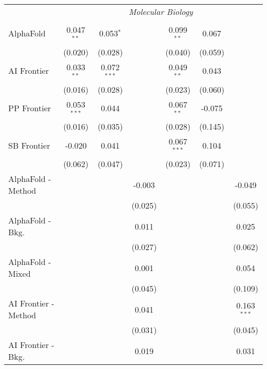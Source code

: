 \begin{tabular}{lcccccc}
 & \multicolumn{6}{c}{\textit{Molecular Biology}} \\ \\
   AlphaFold            & 0.047$^{**}$  & 0.053$^{*}$   &                & 0.099$^{**}$  & 0.067   &   \\   
                        & (0.020)       & (0.028)       &                & (0.040)       & (0.059) &   \\   
   AI Frontier          & 0.033$^{**}$  & 0.072$^{***}$ &                & 0.049$^{**}$  & 0.043   &   \\   
                        & (0.016)       & (0.028)       &                & (0.023)       & (0.060) &   \\   
   PP Frontier          & 0.053$^{***}$ & 0.044         &                & 0.067$^{**}$  & -0.075  &   \\   
                        & (0.016)       & (0.035)       &                & (0.028)       & (0.145) &   \\   
   SB Frontier          & -0.020        & 0.041         &                & 0.067$^{***}$ & 0.104   &   \\   
                        & (0.062)       & (0.047)       &                & (0.023)       & (0.071) &   \\   
   AlphaFold - Method   &               &               & -0.003         &               &         & -0.049\\   
                        &               &               & (0.025)        &               &         & (0.055)\\   
   AlphaFold - Bkg.     &               &               & 0.011          &               &         & 0.025\\   
                        &               &               & (0.027)        &               &         & (0.062)\\   
   AlphaFold - Mixed    &               &               & 0.001          &               &         & 0.054\\   
                        &               &               & (0.045)        &               &         & (0.109)\\   
   AI Frontier - Method &               &               & 0.041          &               &         & 0.163$^{***}$\\   
                        &               &               & (0.031)        &               &         & (0.045)\\   
   AI Frontier - Bkg.   &               &               & 0.019          &               &         & 0.031\\   

\end{tabular}
